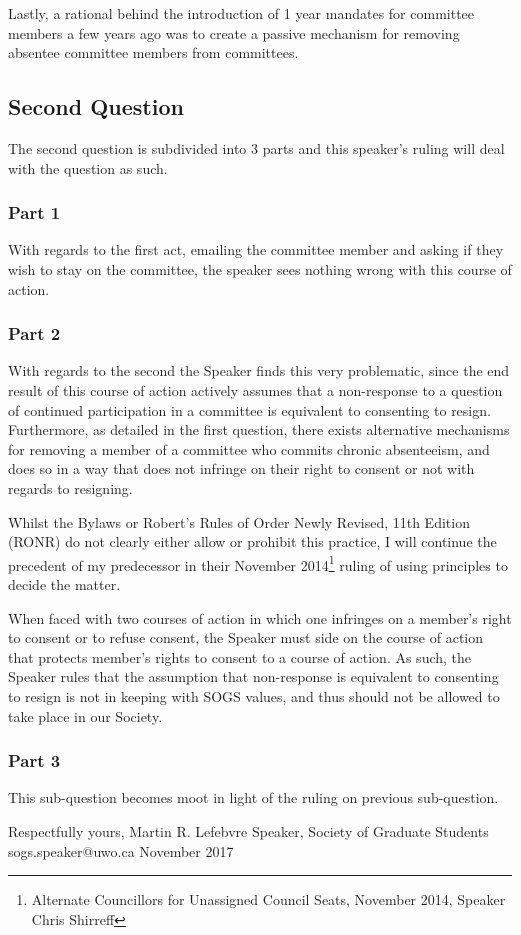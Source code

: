 \begin{multicols}{2}
Lastly, a rational behind the introduction of 1 year mandates for committee members a few years ago was to create a passive mechanism for removing absentee committee members from committees. 


\subsection*{Second Question}

The second question is subdivided into 3 parts and this speaker's ruling will deal with the question as such. 
\subsubsection*{Part 1}
With regards to the first act, emailing the committee member and asking if they wish to stay on the committee, the speaker sees nothing wrong with this course of action. 

\subsubsection*{Part 2}
With regards to the second the Speaker finds this very problematic, since the end result of this course of action actively assumes that a non-response to a question of continued participation in a committee is equivalent to consenting to resign. Furthermore, as detailed in the first question, there exists alternative mechanisms for removing a member of a committee who commits chronic absenteeism, and does so in a way that does not infringe on their right to consent or not with regards to resigning.    

Whilst the Bylaws or Robert's Rules of Order Newly Revised, 11th Edition (RONR) do not clearly either allow or prohibit this practice, I will continue the precedent of my predecessor in their November 2014\footnote{Alternate Councillors for Unassigned Council Seats, November 2014, Speaker Chris Shirreff} ruling of using principles to decide the matter.  

When faced with two courses of action in which one infringes on a member's right to consent or to refuse consent, the Speaker must side on the course of action that protects member's rights to consent to a course of action.  As such, the Speaker rules that the assumption that non-response is equivalent to consenting to resign is not in keeping with SOGS values, and thus should not be allowed to take place in our Society.  
	
\subsubsection*{Part 3}
This sub-question becomes moot in light of the ruling on previous sub-question. 

\end{multicols}


\vskip 2cm
\noindent
Respectfully yours, \newline
\noindent
Martin R. Lefebvre \newline
\indent
Speaker, \newline 
\indent
Society of Graduate Students \newline
\indent
sogs.speaker@uwo.ca \newline
\indent 
November 2017


